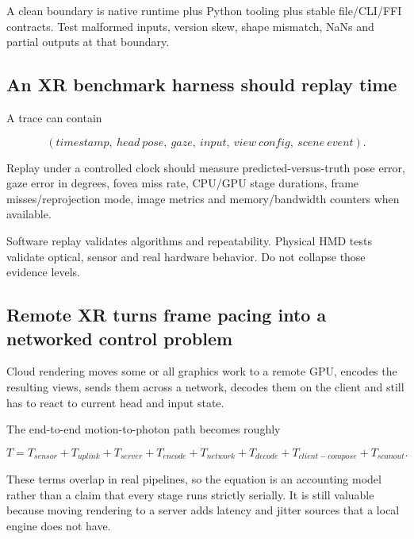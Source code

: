 A clean boundary is native runtime plus Python tooling plus stable file/CLI/FFI contracts. Test malformed inputs, version skew, shape mismatch, NaNs and partial outputs at that boundary.

\subsection{An XR benchmark harness should replay time}\label{06-engine-ii-ch042-an-xr-benchmark-harness-should-replay-time}

\hypertarget{06-engine-ii-ch042-an-xr-benchmark-harness-should-replay-time}{}

A trace can contain

\[
(timestamp,\ head\ pose,\ gaze,\ input,\ view\ config,\ scene\ event).
\]

Replay under a controlled clock should measure predicted-versus-truth pose error, gaze error in degrees, fovea miss rate, CPU/GPU stage durations, frame misses/reprojection mode, image metrics and memory/bandwidth counters when available.

Software replay validates algorithms and repeatability. Physical HMD tests validate optical, sensor and real hardware behavior. Do not collapse those evidence levels.

\subsection{Remote XR turns frame pacing into a networked control problem}\label{06-engine-ii-ch042-remote-xr-turns-frame-pacing-into-a-networked-control-problem}

\hypertarget{06-engine-ii-ch042-remote-xr-turns-frame-pacing-into-a-networked-control-problem}{}

Cloud rendering moves some or all graphics work to a remote GPU, encodes the resulting views, sends them across a network, decodes them on the client and still has to react to current head and input state.

The end-to-end motion-to-photon path becomes roughly

\[
T =
T_{sensor}
+T_{uplink}
+T_{server}
+T_{encode}
+T_{network}
+T_{decode}
+T_{client-compose}
+T_{scanout}.
\]

These terms overlap in real pipelines, so the equation is an accounting model rather than a claim that every stage runs strictly serially. It is still valuable because moving rendering to a server adds latency and jitter sources that a local engine does not have.

